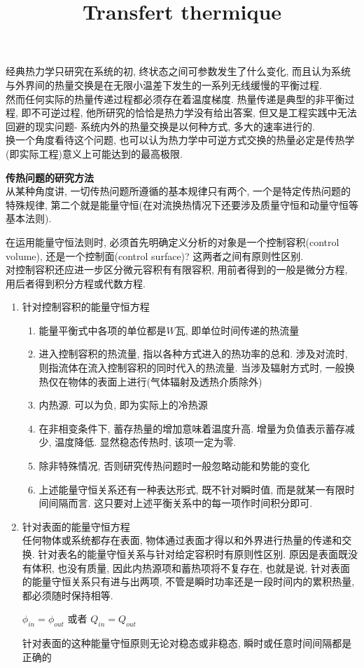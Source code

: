 \documentclass{article}
\begin{document}
\title{Transfert thermique}
\maketitle
\tableofcontents
\newpage
经典热力学只研究在系统的初, 终状态之间可参数发生了什么变化, 而且认为系统与外界间的热量交换是在无限小温差下发生的一系列无线缓慢的平衡过程.\\
然而任何实际的热量传递过程都必须存在着温度梯度. 热量传递是典型的非平衡过程, 即不可逆过程, 他所研究的恰恰是热力学没有给出答案, 但又是工程实践中无法回避的现实问题-
系统内外的热量交换是以何种方式, 多大的速率进行的.\\
换一个角度看待这个问题, 也可以认为热力学中可逆方式交换的热量必定是传热学(即实际工程)意义上可能达到的最高极限.

\bigskip
\textbf{传热问题的研究方法}\\
从某种角度讲, 一切传热问题所遵循的基本规律只有两个, 一个是特定传热问题的特殊规律, 第二个就是能量守恒(在对流换热情况下还要涉及质量守恒和动量守恒等基本法则).

在运用能量守恒法则时, 必须首先明确定义分析的对象是一个控制容积(control volume), 还是一个控制面(control surface)? 这两者之间有原则性区别.\\
对控制容积还应进一步区分微元容积有有限容积, 用前者得到的一般是微分方程, 用后者得到积分方程或代数方程.
\begin{enumerate}
\item 针对控制容积的能量守恒方程
	\begin{enumerate}
	\item 能量平衡式中各项的单位都是$W$瓦, 即单位时间传递的热流量
	\item 进入控制容积的热流量, 指以各种方式进入的热功率的总和. 涉及对流时, 则指流体在流入控制容积的同时代入的热流量. 当涉及辐射方式时, 一般换热仅在物体的表面上进行(气体辐射及透热介质除外)
	\item 内热源. 可以为负, 即为实际上的冷热源
	\item 在非相变条件下, 蓄存热量的增加意味着温度升高. 增量为负值表示蓄存减少, 温度降低. 显然稳态传热时, 该项一定为零.
	\item 除非特殊情况, 否则研究传热问题时一般忽略动能和势能的变化
	\item 上述能量守恒关系还有一种表达形式, 既不针对瞬时值, 而是就某一有限时间间隔而言. 这只要对上述平衡关系中的每一项作时间积分即可.
	\end{enumerate}
\item 针对表面的能量守恒方程\\
	任何物体或系统都存在表面, 物体通过表面才得以和外界进行热量的传递和交换. 针对表名的能量守恒关系与针对给定容积时有原则性区别. 原因是表面既没有体积, 也没有质量,
	因此内热源项和蓄热项将不复存在, 也就是说, 针对表面的能量守恒关系只有进与出两项, 不管是瞬时功率还是一段时间内的累积热量, 都必须随时保持相等.
	\begin{center}
	$\phi_{in} = \phi_{out}$ 或者 $Q_{in} = Q_{out}$
	\end{center}
	针对表面的这种能量守恒原则无论对稳态或非稳态, 瞬时或任意时间间隔都是正确的
\end{enumerate}
\end{document}

